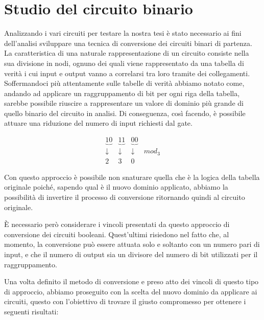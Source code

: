 \documentclass[
]{book}
\begin{document}
\newpage

\hypertarget{studio-del-circuito-binario}{%
\section{Studio del circuito binario}\label{studio-del-circuito-binario}}

Analizzando i vari circuiti per testare la nostra tesi è stato necessario ai fini dell'analisi sviluppare una tecnica di conversione dei circuiti binari di partenza. La caratteristica di una naturale rappresentazione di un circuito consiste nella sua divisione in nodi, ognuno dei quali viene rappresentato da una tabella di verità i cui input e output vanno a correlarsi tra loro tramite dei collegamenti. Soffermandoci più attentamente sulle tabelle di verità abbiamo notato come, andando ad applicare un raggruppamento di bit per ogni riga della tabella, sarebbe possibile riuscire a rappresentare un valore di dominio più grande di quello binario del circuito in analisi. Di conseguenza, così facendo, è possibile attuare una riduzione del numero di input richiesti dal gate.

\[\begin{matrix}
    \underbrace{10} & \underbrace{11} & \underbrace{00} \\
    \downarrow & \downarrow & \downarrow  &mod_3 \\
    2 & 3 & 0
\end{matrix}\]

Con questo approccio è possibile non snaturare quella che è la logica della tabella originale poiché, sapendo qual è il nuovo dominio applicato, abbiamo la possibilità di invertire il processo di conversione ritornando quindi al circuito originale.

È necessario però considerare i vincoli presentati da questo approccio di conversione dei circuiti booleani. Quest'ultimi risiedono nel fatto che, al momento, la conversione può essere attuata solo e soltanto con un numero pari di input, e che il numero di output sia un divisore del numero di bit utilizzati per il raggruppamento.

\newpage

Una volta definito il metodo di conversione e preso atto dei vincoli di questo tipo di approccio, abbiamo proseguito con la scelta del nuovo dominio da applicare ai circuiti, questo con l'obiettivo di trovare il giusto compromesso per ottenere i seguenti risultati:
\end{document}
